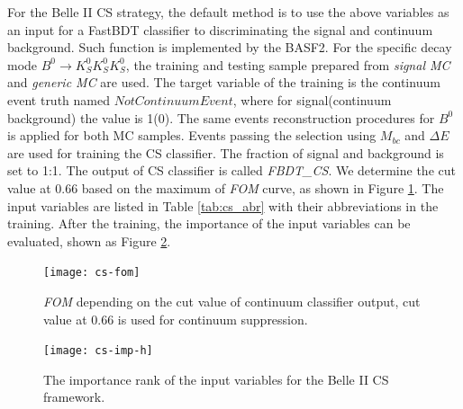 For the Belle II CS strategy, the default method is to use the above variables as an input for a FastBDT classifier to discriminating the signal and continuum background. Such function is implemented by the BASF2. For the specific decay mode $B^0 \to K_S^0  K_S^0  K_S^0$, the training and testing sample prepared from \textit{signal MC} and \textit{generic MC} are used. The target variable of the training is the continuum event truth named $NotContinuumEvent$, where for signal(continuum background) the value is 1(0).  The same events reconstruction procedures for $B^0$ is applied for both MC samples. Events passing the selection using $M_{bc}$ and $\Delta E$ are used for training the CS classifier. The fraction of signal and background is set to 1:1. The output of CS classifier is called \textit{FBDT\_CS}.  We determine the cut value at 0.66 based on the maximum of \textit{FOM} curve, as shown in Figure \ref{fig:cs_fom}. The input variables are listed in Table \ref{tab:cs_abr} with their abbreviations in the training. After the training, the importance of the input variables can be evaluated, shown as Figure \ref{tab:cs_imp-h}.

\begin{figure}[htpb]
	\centering
	\texttt{[image: cs-fom]}
	\caption{\textit{FOM} depending on the cut value of continuum classifier output, cut value at 0.66 is used for continuum suppression. }
	\label{fig:cs_fom}
\end{figure}

\begin{figure}[htpb]
	\centering 
	\caption{The importance rank of the input variables for the Belle II CS framework.}
	\label{tab:cs_imp-h}
	\texttt{[image: cs-imp-h]}
\end{figure}

